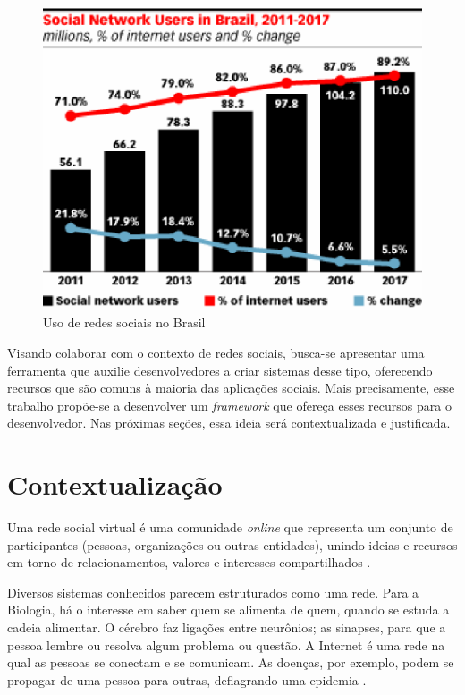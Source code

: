 \begin{figure}[!h]
	\centering
	\includegraphics[scale=0.8]{figuras/capitulo1/social_network_brazil.eps}
	\caption[Uso de redes sociais no Brasil]{Uso de redes sociais no Brasil \cite{eMarketer:2013}}
	\label{social_network_brazil}
\end{figure}

Visando colaborar com o contexto de redes sociais, busca-se apresentar uma ferramenta que auxilie desenvolvedores a criar sistemas desse tipo, oferecendo recursos que são comuns à maioria das aplicações sociais. Mais precisamente, esse trabalho propõe-se a desenvolver um \textit{framework} que ofereça esses recursos para o desenvolvedor. Nas próximas seções, essa ideia será contextualizada e justificada.

\section*{Contextualização}

Uma rede social virtual é uma comunidade \textit{online} que representa um conjunto de participantes (pessoas, organizações ou outras entidades), unindo ideias e recursos em torno de relacionamentos, valores e interesses compartilhados \cite{Marteleto:2001}.

Diversos sistemas conhecidos parecem estruturados como uma rede. Para a Biologia, há o interesse em saber quem se alimenta de quem, quando se estuda a cadeia alimentar. O cérebro faz ligações entre neurônios; as sinapses, para que a pessoa lembre ou resolva algum problema ou questão. A Internet é uma rede na qual as pessoas se conectam e se comunicam. As doenças, por exemplo, podem se propagar de uma pessoa para outras, deflagrando uma epidemia \cite{Goular:2014}.

